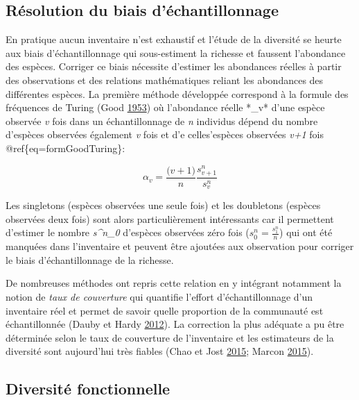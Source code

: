 \documentclass[11pt,french,A4paper,extrafontsizes,onecolumn,openright]{memoir}
\begin{document}
\subsection{Résolution du biais
d'échantillonnage}\label{resolution-du-biais-dechantillonnage}

En pratique aucun inventaire n'est exhaustif et l'étude de la diversité
se heurte aux biais d'échantillonnage qui sous-estiment la richesse et
faussent l'abondance des espèces. Corriger ce biais nécessite d'estimer
les abondances réelles à partir des observations et des relations
mathématiques reliant les abondances des différentes espèces. La
première méthode développée correspond à la formule des fréquences de
Turing (Good \protect\hyperlink{ref-Good1953}{1953}) où l'abondance
réelle *\alpha\_v* d'une espèce observée \emph{v} fois dans un
échantillonnage de \emph{n} individus dépend du nombre d'espèces
observées également \emph{v} fois et d'e celles'espèces observées
\emph{v+1} fois @ref\{eq=formGoodTuring\}:

\begin{equation}
\alpha_v=\frac{\big(v+1\big)}{n}\frac{s^n_{v+1}}{s^n_v}
\label{eq:formGoodTuring}
\end{equation}

Les singletons (espèces observées une seule fois) et les doubletons
(espèces observées deux fois) sont alors particulièrement intéressants
car il permettent d'estimer le nombre \emph{s\^{}n\_0} d'espèces
observées zéro fois (\(s^n_0=\frac{s^n_1}{n}\)) qui ont été manquées
dans l'inventaire et peuvent être ajoutées aux observation pour corriger
le biais d'échantillonnage de la richesse.

De nombreuses méthodes ont repris cette relation en y intégrant
notamment la notion de \emph{taux de couverture} qui quantifie l'effort
d'échantillonnage d'un inventaire réel et permet de savoir quelle
proportion de la communauté est échantillonnée (Dauby et Hardy
\protect\hyperlink{ref-Dauby2012}{2012}). La correction la plus adéquate
a pu être déterminée selon le taux de couverture de l'inventaire et les
estimateurs de la diversité sont aujourd'hui très fiables (Chao et Jost
\protect\hyperlink{ref-Chao2015}{2015}; Marcon
\protect\hyperlink{ref-Marcon2015b}{2015}).

\subsection{Diversité fonctionnelle}\label{diversite-fonctionnelle}
\end{document}
